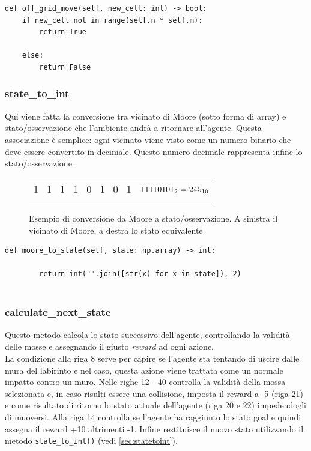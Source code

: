 \begin{lstlisting}[style=python, caption={Metodo per controllare l'uscita dalla matrice}]
def off_grid_move(self, new_cell: int) -> bool:
	if new_cell not in range(self.n * self.m):
		return True
		
	else:
		return False
\end{lstlisting}
\pagebreak
\subsubsection{state\_to\_int}
\label{sec:statetoint}

Qui viene fatta la conversione tra vicinato di Moore (sotto forma di array) e stato/osservazione che l'ambiente andr\`{a} a ritornare all'agente. Questa associazione \`{e} semplice: ogni vicinato viene visto come un numero binario che deve essere convertito in decimale. Questo numero decimale rappresenta infine lo stato/osservazione.

\begin{figure}[H]
	\begin{tabular}{m{20em} m{20em}}
		\begin{equation*}
			\large
			\large
			\begin{matrix}
				1 & 1 & 1 & 1 & 0 & 1 & 0 & 1
			\end{matrix}
		\end{equation*}
		&
		\begin{equation*}
			\large
			11110101_{2} = 245_{10}
		\end{equation*}
	\end{tabular}
	\caption{Esempio di conversione da Moore a stato/osservazione. A sinistra il vicinato di Moore, a destra lo stato equivalente}
\end{figure}

\begin{lstlisting}[style=python, caption={Codice del metodo moore\_to\_state}]
	def moore_to_state(self, state: np.array) -> int:
	
		return int("".join([str(x) for x in state]), 2)
		
\end{lstlisting}

\subsubsection{calculate\_next\_state}
Questo metodo calcola lo stato successivo dell'agente, controllando la validit\`{a} delle mosse e assegnando il giusto \textit{reward} ad ogni azione.\\
La condizione alla riga 8 serve per capire se l'agente sta tentando di uscire dalle mura del labirinto e nel caso, questa azione viene trattata come un normale impatto contro un muro. Nelle righe 12 - 40 controlla la validit\`{a} della mossa selezionata e, in caso risulti essere una collisione, imposta il reward a -5 (riga 21) e come risultato di ritorno lo stato attuale dell'agente (riga 20 e 22) impedendogli di muoversi. Alla riga 14 controlla se l'agente ha raggiunto lo stato goal e quindi assegna il reward +10 altrimenti -1.
Infine restituisce il nuovo stato utilizzando il metodo \lstinline[style=cmd]|state_to_int()| (vedi \autoref{sec:statetoint}).\\

